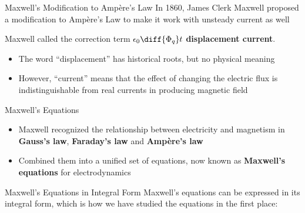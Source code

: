 \documentclass[12pt,aspectratio=169]{beamer}
\begin{document}
\begin{frame}{Maxwell's Modification to Amp\`{e}re's Law}
  In 1860, James Clerk Maxwell proposed a modification to Amp\`{e}re's Law to
  make it work with unsteady current as well



  Maxwell called the correction term $\displaystyle\epsilon_0\diff{\Phi_q}t$
  \textbf{displacement current}.
  \begin{itemize}
  \item The word ``displacement'' has historical roots, but no physical meaning
  \item However, ``current'' means that the effect of changing the electric
    flux is indistinguishable from real currents in producing magnetic field
  \end{itemize}
\end{frame}



\begin{frame}{Maxwell's Equations}
  \begin{itemize}
  \item Maxwell recognized the relationship between electricity and
    magnetism in \textbf{Gauss's law}, \textbf{Faraday's law} and
    \textbf{Amp\`{e}re's law}
  \item Combined them into a unified set of equations, now known as
    \textbf{Maxwell's equations} for electrodynamics
  \end{itemize}
\end{frame}



\begin{frame}{Maxwell's Equations in Integral Form}
  Maxwell's equations can be expressed in its integral form, which is how we
  have studied the equations in the first place:

\end{frame}
\end{document}
